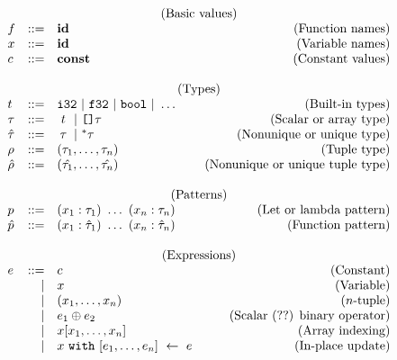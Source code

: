 %
\begin{figure}
\begin{equation}
\begin{array}{lrlr}
\multicolumn{4}{c}{\text{(Basic values)}} \\
f & ::= & \textbf{id} & \text{(Function names)} \\
x & ::= & \textbf{id} & \text{(Variable names)} \\
c & ::= & \textbf{const} & \text{(Constant values)} \\
\\
\multicolumn{4}{c}{\text{(Types)}} \\
t & ::= & \mathtt{i32}~|~\mathtt{f32}~|~\mathtt{bool}~|~\dots & \text{(Built-in types)} \\
\tau & ::=       & \makebox[10pt][c]{$t$}~|~\texttt{[]}\tau & \text{(Scalar or array type)} \\
\hat{\tau} & ::= & \makebox[10pt][c]{$\tau$}~|~^*\tau & \text{(Nonunique or unique type)} \\
\rho & ::= & (\tau_1, \dots, \tau_n) & \text{(Tuple type)} \\
\hat{\rho} & ::= & (\hat{\tau_1}, \dots, \hat{\tau_n}) & \text{(Nonunique or unique tuple type)} \\
\\
\multicolumn{4}{c}{\text{(Patterns)}} \\
p & ::= & (x_1 : \tau_1)~\dots~(x_n : \tau_n) & \text{(Let or lambda pattern)} \\
\hat{p} & ::= & (x_1 : \hat{\tau}_1)~\dots~(x_n : \hat{\tau}_n) & \text{(Function pattern)} \\
\\
\multicolumn{4}{c}{\text{(Expressions)}} \\
e & ::= & c & \text{(Constant)} \\
& | & x & \text{(Variable)} \\
& | & (x_1, \dots, x_n) & \text{($n$-tuple)} \\
& | & e_1 \oplus e_2 & \text{(Scalar (??) binary operator)} \\
& | & x[x_1, \dots, x_n] & \text{(Array indexing)} \\
& | & x~\mathtt{with}~[e_1, \dots, e_n]~\leftarrow~e & \text{(In-place update)} \\

\end{array}
\end{equation}
\end{figure}
